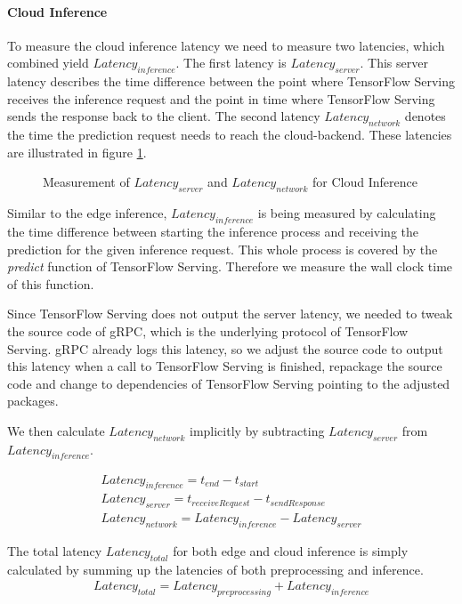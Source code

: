 \paragraph{Cloud Inference}
To measure the cloud inference latency we need to measure two latencies, which combined yield $Latency_{inference}$. The first latency is  $Latency_{server}$. This server latency describes the time difference between the point where TensorFlow Serving receives the inference request and the point in time where TensorFlow Serving sends the response back to the client.
The second latency $Latency_{network}$ denotes the time the prediction request needs to reach the cloud-backend.
These latencies are illustrated in figure \ref{fig:serverLat}.
\begin{figure}[!htb]
\centering

\caption{Measurement of $Latency_{server}$ and $Latency_{network}$ for Cloud Inference}
\label{fig:serverLat}
\end{figure}


Similar to the edge inference, $Latency_{inference}$ is being measured by calculating the time difference between starting the inference process and receiving the prediction for the given inference request. This whole process is covered by the \emph{predict} function of TensorFlow Serving. Therefore we measure the wall clock time of this function.

Since TensorFlow Serving does not output the server latency, we needed to tweak the source code of gRPC, which is the underlying protocol of TensorFlow Serving. gRPC already logs this latency, so we adjust the source code to output this latency when a call to TensorFlow Serving is finished, repackage the source code and change to dependencies of TensorFlow Serving pointing to the adjusted packages.

We then calculate $Latency_{network}$ implicitly by subtracting $Latency_{server}$ from $Latency_{inference}$.

\begin{equation*}
\begin{gathered}
Latency_{inference} = t_{end} - t_{start}\\
Latency_{server}= t_{receive Request} - t_{send Response}\\
Latency_{network} = Latency_{inference} - Latency_{server}
\end{gathered}
\end{equation*}


The total latency $Latency_{total}$ for both edge and cloud inference is simply calculated by summing up the latencies of both preprocessing and inference.
\begin{equation*}
\begin{gathered}
Latency_{total} = Latency_{preprocessing} + Latency_{inference}
\end{gathered}
\end{equation*}
